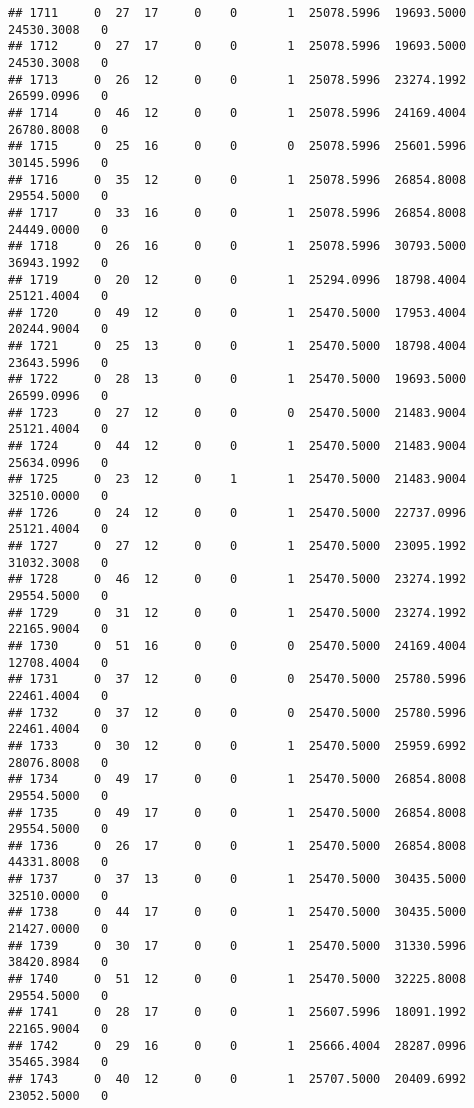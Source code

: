 \documentclass[
]{article}
\begin{document}
\begin{enumerate}
\begin{verbatim}
## 1711     0  27  17     0    0       1  25078.5996  19693.5000  24530.3008   0
## 1712     0  27  17     0    0       1  25078.5996  19693.5000  24530.3008   0
## 1713     0  26  12     0    0       1  25078.5996  23274.1992  26599.0996   0
## 1714     0  46  12     0    0       1  25078.5996  24169.4004  26780.8008   0
## 1715     0  25  16     0    0       0  25078.5996  25601.5996  30145.5996   0
## 1716     0  35  12     0    0       1  25078.5996  26854.8008  29554.5000   0
## 1717     0  33  16     0    0       1  25078.5996  26854.8008  24449.0000   0
## 1718     0  26  16     0    0       1  25078.5996  30793.5000  36943.1992   0
## 1719     0  20  12     0    0       1  25294.0996  18798.4004  25121.4004   0
## 1720     0  49  12     0    0       1  25470.5000  17953.4004  20244.9004   0
## 1721     0  25  13     0    0       1  25470.5000  18798.4004  23643.5996   0
## 1722     0  28  13     0    0       1  25470.5000  19693.5000  26599.0996   0
## 1723     0  27  12     0    0       0  25470.5000  21483.9004  25121.4004   0
## 1724     0  44  12     0    0       1  25470.5000  21483.9004  25634.0996   0
## 1725     0  23  12     0    1       1  25470.5000  21483.9004  32510.0000   0
## 1726     0  24  12     0    0       1  25470.5000  22737.0996  25121.4004   0
## 1727     0  27  12     0    0       1  25470.5000  23095.1992  31032.3008   0
## 1728     0  46  12     0    0       1  25470.5000  23274.1992  29554.5000   0
## 1729     0  31  12     0    0       1  25470.5000  23274.1992  22165.9004   0
## 1730     0  51  16     0    0       0  25470.5000  24169.4004  12708.4004   0
## 1731     0  37  12     0    0       0  25470.5000  25780.5996  22461.4004   0
## 1732     0  37  12     0    0       0  25470.5000  25780.5996  22461.4004   0
## 1733     0  30  12     0    0       1  25470.5000  25959.6992  28076.8008   0
## 1734     0  49  17     0    0       1  25470.5000  26854.8008  29554.5000   0
## 1735     0  49  17     0    0       1  25470.5000  26854.8008  29554.5000   0
## 1736     0  26  17     0    0       1  25470.5000  26854.8008  44331.8008   0
## 1737     0  37  13     0    0       1  25470.5000  30435.5000  32510.0000   0
## 1738     0  44  17     0    0       1  25470.5000  30435.5000  21427.0000   0
## 1739     0  30  17     0    0       1  25470.5000  31330.5996  38420.8984   0
## 1740     0  51  12     0    0       1  25470.5000  32225.8008  29554.5000   0
## 1741     0  28  17     0    0       1  25607.5996  18091.1992  22165.9004   0
## 1742     0  29  16     0    0       1  25666.4004  28287.0996  35465.3984   0
## 1743     0  40  12     0    0       1  25707.5000  20409.6992  23052.5000   0

\end{verbatim}
\end{enumerate}
\end{document}
